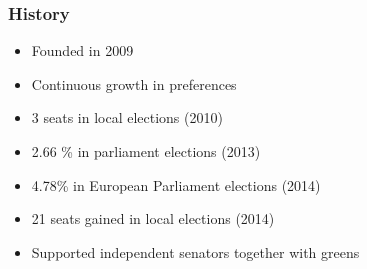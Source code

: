 \begin{frame}
	\frametitle{History}
	\begin{itemize}
		\item Founded in 2009
		\item Continuous growth in preferences 
		\item 3 seats in local elections (2010)
		\item 2.66 \% in parliament elections (2013)
		\item 4.78\% in European Parliament elections (2014)
		\item 21 seats gained in local elections (2014)
		\item Supported independent senators together with greens
	\end{itemize}
	
\end{frame}
